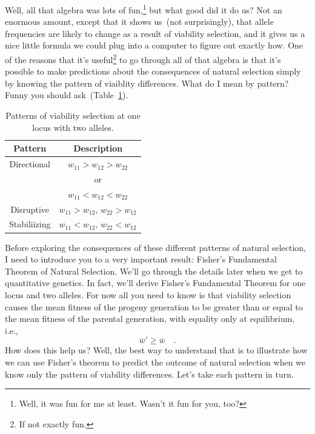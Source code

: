 Well, all that algebra was lots of fun,\footnote{Well, it was fun for
  me at least. Wasn't it fun for you, too?} but what good did it do
us? Not an enormous amount, except that it shows us~(not
surprisingly), that allele frequencies are likely to change as a
result of viability selection, and it gives us a nice little formula
we could plug into a computer to figure out exactly how. One of the
reasons that it's useful\footnote{If not exactly fun.} to go through
all of that algebra is that it's possible to make predictions about
the consequences of natural selection simply by knowing the pattern of
viaiblity differences. What do I mean by pattern? Funny you should
ask~(Table~\ref{table:patterns}).

\begin{table}
\begin{center}
\begin{tabular}{cc}
\hline\hline
Pattern & Description \\
\hline
Directional & $w_{11} > w_{12} > w_{22}$ \\
            & or \\
            & $w_{11} < w_{12} < w_{22}$ \\
Disruptive  & $w_{11} > w_{12}$, $w_{22} > w_{12}$ \\
Stabiliizing& $w_{11} < w_{12}$, $w_{22} < w_{12}$ \\
\hline
\end{tabular}
\end{center}
\caption{Patterns of viability selection at one locus with two alleles.}\label{table:patterns}
\end{table}

Before exploring the consequences of these different patterns of
natural selection, I need to introduce you to a very important result:
Fisher's Fundamental Theorem of Natural Selection. We'll go through
the details later when we get to quantitative genetics. In fact, we'll
derive Fisher's Fundamental Theorem for one locus and two alleles. For
now all you need to know is that viability selection causes the mean
fitness of the progeny generation to be greater than or equal to the
mean fitness of the parental generation, with equality only at
equilibrium, i.e.,
\[
\bar w' \ge \bar w \quad .
\]
How does this help us? Well, the best way to understand that is to
illustrate how we can use Fisher's theorem to predict the outcome of
natural selection when we know only the pattern of viability
differences. Let's take each pattern in turn.

